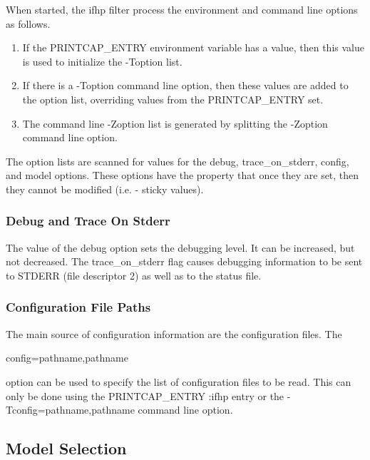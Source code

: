 \documentclass[a4paper]{article}
\begin{document}
When started,
the
{\ttfamily ifhp}
filter process the environment and command line options as follows.
\begin{enumerate}
\item If the
{\ttfamily PRINTCAP\_ENTRY}
environment variable has a value,
then this value is used to initialize the
{\ttfamily -Toption}
list.
\item If there is a
{\ttfamily -Toption}
command line option,
then these values are added to the
option list,
overriding values from the
{\ttfamily PRINTCAP\_ENTRY}
set.
\item The command line
{\ttfamily -Zoption}
list is generated by splitting the
{\ttfamily -Zoption}
command line option.
\end{enumerate}


The option lists are scanned for values for the
{\ttfamily debug},
{\ttfamily trace\_on\_stderr},
{\ttfamily config},
and
{\ttfamily model}
options.
These options
have the property that once they are set, then they cannot be modified
(i.e. - sticky values).


\subsubsection{Debug and Trace On Stderr
\label{debug}
\label{trace_on_stderr}}

The value of the
{\ttfamily debug}
option sets the debugging level.
It can be increased, but not decreased.
The
{\ttfamily trace\_on\_stderr}
flag causes debugging information to be sent to STDERR (file descriptor 2)
as well as to the status file.


\subsubsection{Configuration File Paths
\label{configpaths}
\label{config}}

The main source of configuration information are the configuration files.
The
\begin{tscreen}
config=pathname,pathname
\end{tscreen}

option can be used to specify the list of configuration files to be read.
This can only be done using the
{\ttfamily PRINTCAP\_ENTRY}
{\ttfamily :ifhp}
entry or the
{\ttfamily -Tconfig=pathname,pathname}
command line option.


\subsection{Model Selection
\label{modelselect}
\label{model}}
\end{document}
